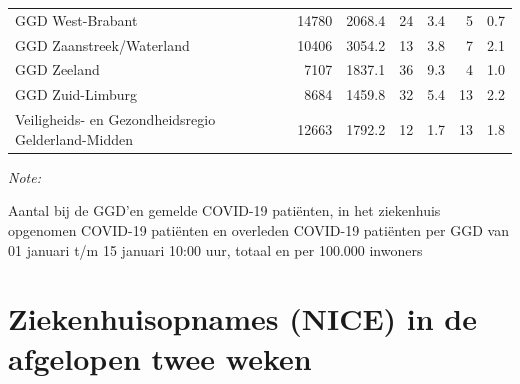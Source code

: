 \documentclass[
  english,
  man,floatsintext]{apa6}
\begin{document}
\begin{table}
\begin{threeparttable}
\begin{tabular}{lrrrrrr}
GGD West-Brabant & 14780 & 2068.4 & 24 & 3.4 & 5 & 0.7\\
GGD Zaanstreek/Waterland & 10406 & 3054.2 & 13 & 3.8 & 7 & 2.1\\
GGD Zeeland & 7107 & 1837.1 & 36 & 9.3 & 4 & 1.0\\
GGD Zuid-Limburg & 8684 & 1459.8 & 32 & 5.4 & 13 & 2.2\\
Veiligheids- en Gezondheidsregio Gelderland-Midden & 12663 & 1792.2 & 12 & 1.7 & 13 & 1.8\\
\bottomrule
\end{tabular}
\begin{tablenotes}
\item \textit{Note: } 
\item Aantal bij de GGD’en gemelde COVID-19 patiënten, in het ziekenhuis opgenomen COVID-19 patiënten en overleden COVID-19 patiënten per GGD van 01 januari t/m 15 januari 10:00 uur, totaal en per 100.000 inwoners
\end{tablenotes}
\end{threeparttable}
\endgroup{}
\end{table}

\newpage

\hypertarget{ziekenhuisopnames-nice-in-de-afgelopen-twee-weken}{%
\section{Ziekenhuisopnames (NICE) in de afgelopen twee weken}\label{ziekenhuisopnames-nice-in-de-afgelopen-twee-weken}}
\end{document}
